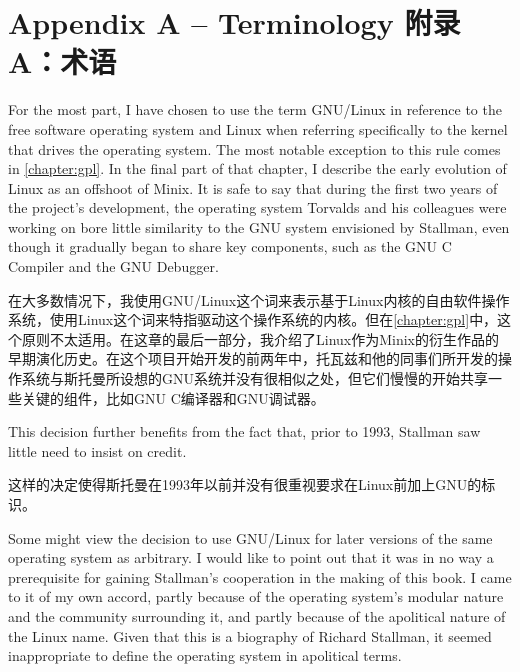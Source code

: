 

\chapter{\ifdefined\eng
Appendix A -- Terminology
\fi
\ifdefined\chs
附录A：术语
\fi
}
\thispagestyle{empty}
\ifdefined\eng
For the most part, I have chosen to use the term GNU/Linux in reference to the free software operating system and Linux when referring specifically to the kernel that drives the operating system. The most notable exception to this rule comes in \autoref{chapter:gpl}. In the final part of that chapter, I describe the early evolution of Linux as an offshoot of Minix. It is safe to say that during the first two years of the project's development, the operating system Torvalds and his colleagues were working on bore little similarity to the GNU system envisioned by Stallman, even though it gradually began to share key components, such as the GNU C Compiler and the GNU Debugger.
\fi

\ifdefined\chs
在大多数情况下，我使用GNU/Linux这个词来表示基于Linux内核的自由软件操作系统，使用Linux这个词来特指驱动这个操作系统的内核。但在\autoref{chapter:gpl}中，这个原则不太适用。在这章的最后一部分，我介绍了Linux作为Minix的衍生作品的早期演化历史。在这个项目开始开发的前两年中，托瓦兹和他的同事们所开发的操作系统与斯托曼所设想的GNU系统并没有很相似之处，但它们慢慢的开始共享一些关键的组件，比如GNU C编译器和GNU调试器。
\fi

\ifdefined\eng
This decision further benefits from the fact that, prior to 1993, Stallman saw little need to insist on credit.
\fi

\ifdefined\chs
这样的决定使得斯托曼在1993年以前并没有很重视要求在Linux前加上GNU的标识。
\fi

\ifdefined\eng
Some might view the decision to use GNU/Linux for later versions of the same operating system as arbitrary. I would like to point out that it was in no way a prerequisite for gaining Stallman's cooperation in the making of this book. I came to it of my own accord, partly because of the operating system's modular nature and the community surrounding it, and partly because of the apolitical nature of the Linux name. Given that this is a biography of Richard Stallman, it seemed inappropriate to define the operating system in apolitical terms.
\fi

